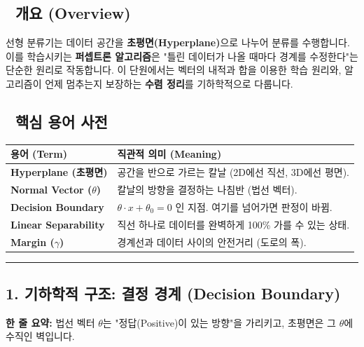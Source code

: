 \documentclass[11pt,a4paper]{book}
\theoremstyle{definition}
\begin{document}
\subsection*{📌 개요 (Overview)}
선형 분류기는 데이터 공간을 \textbf{초평면(Hyperplane)}으로 나누어 분류를 수행합니다. 이를 학습시키는 \textbf{퍼셉트론 알고리즘}은 "틀린 데이터가 나올 때마다 경계를 수정한다"는 단순한 원리로 작동합니다. 이 단원에서는 벡터의 내적과 합을 이용한 학습 원리와, 알고리즘이 언제 멈추는지 보장하는 \textbf{수렴 정리}를 기하학적으로 다룹니다.

\subsection*{📝 핵심 용어 사전}
\begin{table}[h]
\centering
\begin{tabularx}{\textwidth}{|p{}|X|}
\hline
\textbf{용어 (Term)} & \textbf{직관적 의미 (Meaning)} \\
\hline
\textbf{Hyperplane (초평면)} & 공간을 반으로 가르는 칼날 (2D에선 직선, 3D에선 평면). \\
\hline
\textbf{Normal Vector ($\theta$)} & 칼날의 방향을 결정하는 나침반 (법선 벡터). \\
\hline
\textbf{Decision Boundary} & $\theta \cdot x + \theta_0 = 0$ 인 지점. 여기를 넘어가면 판정이 바뀜. \\
\hline
\textbf{Linear Separability} & 직선 하나로 데이터를 완벽하게 100\% 가를 수 있는 상태. \\
\hline
\textbf{Margin ($\gamma$)} & 경계선과 데이터 사이의 안전거리 (도로의 폭). \\
\hline
\end{tabularx}
\end{table}

\vspace{0.5cm}\hrule\vspace{0.5cm}

\subsection{1. 기하학적 구조: 결정 경계 (Decision Boundary)}

\begin{conceptbox}[title={개념 1: 공간을 가르는 칼}]
\textbf{한 줄 요약:} 법선 벡터 $\theta$는 "정답(Positive)이 있는 방향"을 가리키고, 초평면은 그 $\theta$에 수직인 벽입니다.
\end{conceptbox}
\end{document}

